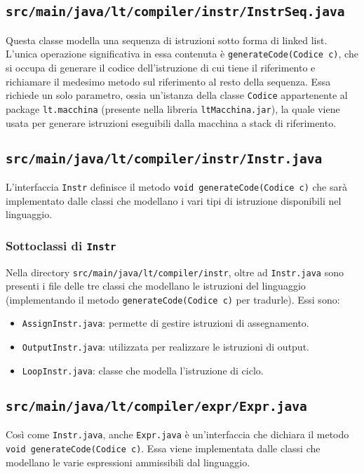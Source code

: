 \documentclass[hidelinks,10pt,a4paper]{article}
\begin{document}
\subsection{\texttt{src/main/java/lt/compiler/instr/InstrSeq.java}}
Questa classe modella una sequenza di istruzioni sotto forma di linked list.
L'unica operazione significativa in essa contenuta è \texttt{generateCode(Codice c)}, che si occupa di generare il codice dell'istruzione di cui tiene il riferimento e richiamare il medesimo metodo sul riferimento al resto della sequenza.
Essa richiede un solo parametro, ossia un'istanza della classe \texttt{Codice} appartenente al package \texttt{lt.macchina} (presente nella libreria \texttt{ltMacchina.jar}), la quale viene usata per generare istruzioni eseguibili dalla macchina a stack di riferimento.

\subsection{\texttt{src/main/java/lt/compiler/instr/Instr.java}}
L'interfaccia \texttt{Instr} definisce il metodo \texttt{void generateCode(Codice c)} che sarà implementato dalle classi che modellano i vari tipi di istruzione disponibili nel linguaggio.

\subsubsection{Sottoclassi di \texttt{Instr}}
Nella directory \texttt{src/main/java/lt/compiler/instr}, oltre ad \texttt{Instr.java} sono presenti i file delle tre classi che modellano le istruzioni del linguaggio (implementando il metodo \texttt{generateCode(Codice c)} per tradurle).
Essi sono:
\begin{itemize}
    \item \texttt{AssignInstr.java}: permette di gestire istruzioni di assegnamento.
    \item \texttt{OutputInstr.java}: utilizzata per realizzare le istruzioni di output.
    \item \texttt{LoopInstr.java}: classe che modella l'istruzione di ciclo.
\end{itemize}

\subsection{\texttt{src/main/java/lt/compiler/expr/Expr.java}}
Così come \texttt{Instr.java}, anche \texttt{Expr.java} è un'interfaccia che dichiara il metodo \texttt{void generateCode(Codice c)}.
Essa viene implementata dalle classi che modellano le varie espressioni ammissibili dal linguaggio.
\end{document}
